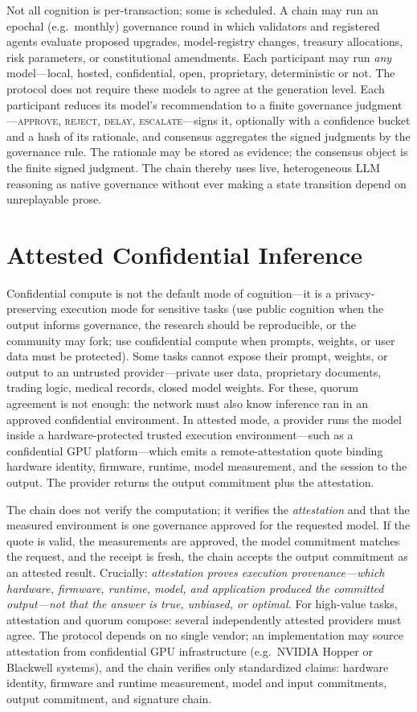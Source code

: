 \documentclass[11pt]{article}
\begin{document}
Not all cognition is per-transaction; some is scheduled. A chain may run an epochal (e.g.\ monthly) governance round in which validators and registered agents evaluate proposed upgrades, model-registry changes, treasury allocations, risk parameters, or constitutional amendments. Each participant may run \emph{any} model---local, hosted, confidential, open, proprietary, deterministic or not. The protocol does not require these models to agree at the generation level. Each participant reduces its model's recommendation to a finite governance judgment---\textsc{approve}, \textsc{reject}, \textsc{delay}, \textsc{escalate}---signs it, optionally with a confidence bucket and a hash of its rationale, and consensus aggregates the signed judgments by the governance rule. The rationale may be stored as evidence; the consensus object is the finite signed judgment. The chain thereby uses live, heterogeneous LLM reasoning as native governance without ever making a state transition depend on unreplayable prose.

\section{Attested Confidential Inference}
\label{sec:attested}

Confidential compute is not the default mode of cognition---it is a privacy-preserving execution mode for sensitive tasks (use public cognition when the output informs governance, the research should be reproducible, or the community may fork; use confidential compute when prompts, weights, or user data must be protected). Some tasks cannot expose their prompt, weights, or output to an untrusted provider---private user data, proprietary documents, trading logic, medical records, closed model weights. For these, quorum agreement is not enough: the network must also know inference ran in an approved confidential environment. In attested mode, a provider runs the model inside a hardware-protected trusted execution environment---such as a confidential GPU platform---which emits a remote-attestation quote binding hardware identity, firmware, runtime, model measurement, and the session to the output. The provider returns the output commitment plus the attestation.

The chain does not verify the computation; it verifies the \emph{attestation} and that the measured environment is one governance approved for the requested model. If the quote is valid, the measurements are approved, the model commitment matches the request, and the receipt is fresh, the chain accepts the output commitment as an attested result. Crucially: \emph{attestation proves execution provenance---which hardware, firmware, runtime, model, and application produced the committed output---not that the answer is true, unbiased, or optimal.} For high-value tasks, attestation and quorum compose: several independently attested providers must agree. The protocol depends on no single vendor; an implementation may source attestation from confidential GPU infrastructure (e.g.\ NVIDIA Hopper or Blackwell systems), and the chain verifies only standardized claims: hardware identity, firmware and runtime measurement, model and input commitments, output commitment, and signature chain.
\end{document}
